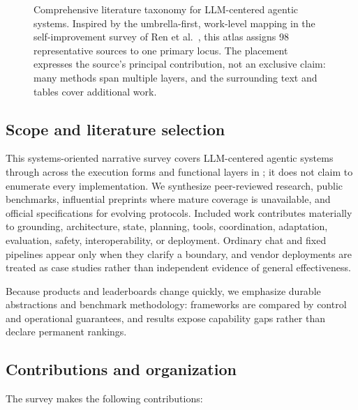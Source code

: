 \begin{figure}[p]
\caption{Comprehensive literature taxonomy for LLM-centered agentic systems. Inspired by the umbrella-first, work-level mapping in the self-improvement survey of Ren et al.~\cite{ren2026selfimprovingagents}, this atlas assigns 98 representative sources to one primary locus. The placement expresses the source's principal contribution, not an exclusive claim: many methods span multiple layers, and the surrounding text and tables cover additional work.}
\label{fig:literature-atlas}
\end{figure}

\subsection{Scope and literature selection}
\label{sec:survey-method}

This systems-oriented narrative survey covers LLM-centered agentic systems through \reviewcutoff across the execution forms and functional layers in ; it does not claim to enumerate every implementation. We synthesize peer-reviewed research, public benchmarks, influential preprints where mature coverage is unavailable, and official specifications for evolving protocols. Included work contributes materially to grounding, architecture, state, planning, tools, coordination, adaptation, evaluation, safety, interoperability, or deployment. Ordinary chat and fixed pipelines appear only when they clarify a boundary, and vendor deployments are treated as case studies rather than independent evidence of general effectiveness.

Because products and leaderboards change quickly, we emphasize durable abstractions and benchmark methodology: frameworks are compared by control and operational guarantees, and results expose capability gaps rather than declare permanent rankings.

\subsection{Contributions and organization}

The survey makes the following contributions:

